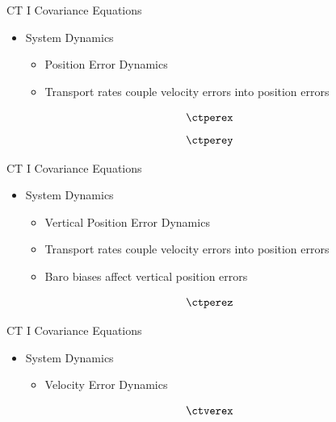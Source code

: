 \begin{frame}
CT I Covariance Equations
\begin{itemize}
  \item System Dynamics
	\begin{itemize}
  		\item Position Error Dynamics
		\item Transport rates couple velocity errors into position errors
	\end{itemize}
\end{itemize}
\begin{equation}\label{ctperex}
\ctperex
\end{equation}
\begin{equation}\label{ctperey}
\ctperey
\end{equation}  
\end{frame}

\begin{frame}
CT I Covariance Equations
\begin{itemize}
  \item System Dynamics
	\begin{itemize}
  		\item Vertical Position Error Dynamics
		\item Transport rates couple velocity errors into position errors
		\item Baro biases affect vertical position errors
	\end{itemize}
\end{itemize}
\begin{equation}\label{ctperez}
\ctperez
\end{equation}
\end{frame}

\begin{frame}
CT I Covariance Equations
\begin{itemize}
  \item System Dynamics
	\begin{itemize}
		\item Velocity Error Dynamics
	\end{itemize}
\end{itemize} 
\begin{align}\label{ctverex}
\ctverex
\end{align} 
\end{frame}

